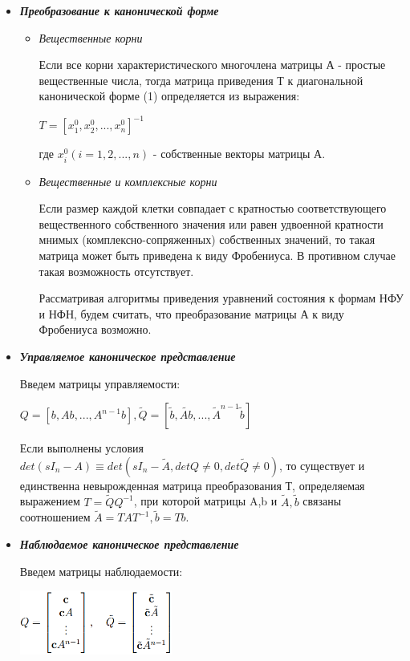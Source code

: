 \documentclass[14pt,a4paper,report]{report}
\begin{document}
\begin{itemize}
	\item \emph{\textbf{Преобразование к канонической форме}}

	\begin{itemize}
		\item \emph{Вещественные корни}
	
		Если все корни характеристического многочлена матрицы А - простые вещественные числа, тогда матрица приведения Т к диагональной канонической форме (1) определяется из выражения:
		\begin{center}
			$T=[x^0_1, x^0_2,..., x^0_n]^{-1}$
		\end{center}
		где $x^0_i(i=1,2,...,n)$ - собственные векторы матрицы А.
		
		\item \emph{Вещественные и комплексные корни}
		
		Если размер каждой клетки совпадает с кратностью соответствующего вещественного собственного значения или равен удвоенной кратности мнимых
		(комплексно-сопряженных) собственных значений, то такая матрица может быть приведена к виду Фробениуса. В противном случае такая возможность отсутствует.
		
		Рассматривая алгоритмы приведения уравнений состояния к формам НФУ и НФН, будем считать, что преобразование матрицы А к виду Фробениуса возможно.
	\end{itemize}
		
	\item \emph{\textbf{Управляемое каноническое представление}}
	
	Введем матрицы управляемости:
	\begin{center}
		$Q=[b, Ab, ..., A^{n-1}b], \widetilde{Q}=[\widetilde{b}, \widetilde{Ab}, ..., \widetilde{A}^{n-1}\widetilde{b}]$
	\end{center}
	
	Если выполнены условия $det(sI_n-A)\equiv det(sI_n-\widetilde{A}, detQ\neq0, det\widetilde{Q}\neq0)$, то существует и единственна невырожденная матрица преобразования Т, определяемая выражением	$T=\widetilde{Q}Q^{-1}$, при которой матрицы A,b и $\widetilde{A}, \widetilde{b}$ связаны соотношением $\widetilde{A}=TAT^{-1}, \widetilde{b}=Tb$.
	
	\item \emph{\textbf{Наблюдаемое каноническое представление}}
	
	Введем матрицы наблюдаемости:
	
	\begin{center}
		\includegraphics[width=5cm]{images/6.png}
	\end{center}
	

\end{itemize}
\end{document}
